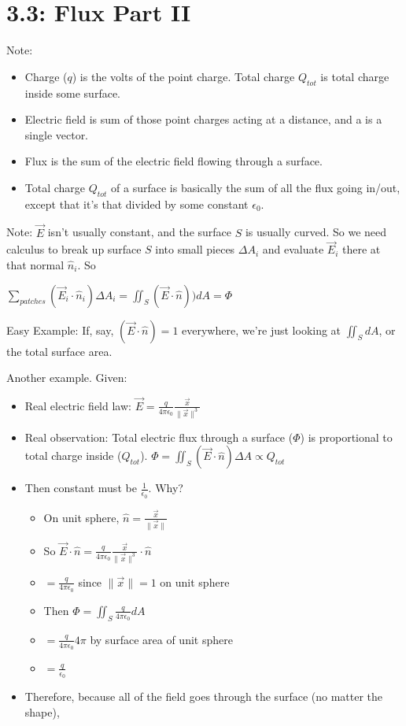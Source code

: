\documentclass[11pt, oneside]{article}   	%
\begin{document}
\section{3.3: Flux Part II}

Note: 
\begin{itemize}
\item Charge ($q$) is the volts of the point charge.  Total charge $Q_{tot}$ is total charge inside some surface.
\item Electric field is sum of those point charges acting at a distance, and a is a single vector.
\item Flux is the sum of the electric field flowing through a surface.
\item Total charge $Q_{tot}$ of a surface is basically the sum of all the flux going in/out, except that it's that divided by some constant $\epsilon_0$. 
\end{itemize}
Note: $\vec{E}$ isn't usually constant, and the surface $S$ is usually curved.  So we need calculus to break up surface $S$ into small pieces $\Delta A_i$ and evaluate $\vec{E}_i$ there at that normal $\hat{n}_i$.  So

$\sum_{patches} (\vec{E}_i \cdot \hat{n}_i) \Delta A_i = \iint_S (\vec{E} \cdot \hat{n})) dA = \Phi$

Easy Example: If, say, $ (\vec{E} \cdot \hat{n}) = 1 $ everywhere, we're just looking at $\iint_S dA$, or the total surface area.

Another example.  Given:
\begin{itemize}
\item Real electric field law: $\vec{E} = \frac{q}{4\pi \epsilon_0} \frac{\vec{x}}{\|\vec{x}\|^3}$
\item Real observation: Total electric flux through a surface ($\Phi$) is proportional to total charge inside ($Q_{tot}$).  $\Phi = \iint_S (\vec{E} \cdot \hat{n}) \Delta A \propto Q_{tot}$
\item Then constant must be $\frac{1}{\epsilon_0} $. Why?
\begin{itemize}
\item On unit sphere, $\hat{n}= \frac{\vec{x}}{\| \vec{x}\|}$
\item So $\vec{E} \cdot \hat{n} = \frac{q}{4\pi \epsilon_0} \frac{\vec{x}}{\|\vec{x}\|^3} \cdot \hat{n}$
\item $= \frac{q}{4\pi \epsilon_0}$ since $\| \vec{x}  \|=1$ on unit sphere
\item Then $\Phi = \iint_S \frac{q}{4 \pi \epsilon_0} dA$
\item  $= \frac{q}{4 \pi \epsilon_0} 4 \pi$ by surface area of unit sphere
\item $= \frac{q}{\epsilon_0}$
\end{itemize}
\item Therefore, because all of the field goes through the surface (no matter the shape), 
\end{itemize}
\end{document}
